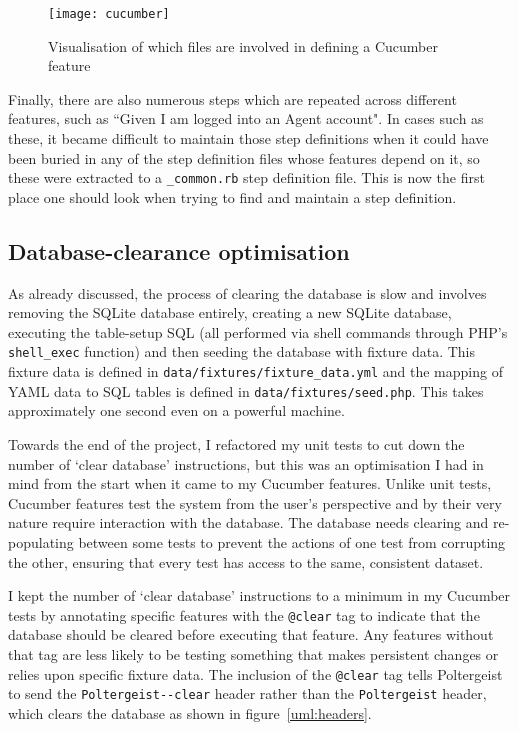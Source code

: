 \begin{figure}[h!]
  \centering
    \ifimages
    \texttt{[image: cucumber]}
    \fi
  \caption{Visualisation of which files are involved in defining a Cucumber feature}
  \label{uml:cucumber}
\end{figure}

Finally, there are also numerous steps which are repeated across different features, such as ``Given I am logged into an Agent account". In cases such as these, it became difficult to maintain those step definitions when it could have been buried in any of the step definition files whose features depend on it, so these were extracted to a \lstinline{_common.rb} step definition file. This is now the first place one should look when trying to find and maintain a step definition.

\subsection{Database-clearance optimisation}

As already discussed, the process of clearing the database is slow and involves removing the SQLite database entirely, creating a new SQLite database, executing the table-setup SQL (all performed via shell commands through PHP's \lstinline{shell_exec} function) and then seeding the database with fixture data. This fixture data is defined in \lstinline{data/fixtures/fixture_data.yml} and the mapping of YAML data to SQL tables is defined in \lstinline{data/fixtures/seed.php}. This takes approximately one second even on a powerful machine.

Towards the end of the project, I refactored my unit tests to cut down the number of `clear database' instructions, but this was an optimisation I had in mind from the start when it came to my Cucumber features. Unlike unit tests, Cucumber features test the system from the user's perspective and by their very nature require interaction with the database. The database needs clearing and re-populating between some tests to prevent the actions of one test from corrupting the other, ensuring that every test has access to the same, consistent dataset.

I kept the number of `clear database' instructions to a minimum in my Cucumber tests by annotating specific features with the \lstinline{@clear} tag to indicate that the database should be cleared before executing that feature. Any features without that tag are less likely to be testing something that makes persistent changes or relies upon specific fixture data. The inclusion of the \lstinline{@clear} tag tells Poltergeist to send the \lstinline{Poltergeist--clear} header rather than the \lstinline{Poltergeist} header, which clears the database as shown in figure~\ref{uml:headers}.


